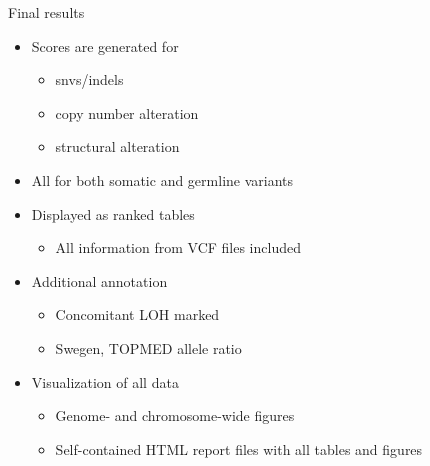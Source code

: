 \documentclass[usepdftitle=false]{beamer}
\begin{document}
\begin{frame}{Final results}
	\begin{itemize}
		\item Scores are generated for
		\begin{itemize}
			\item snvs/indels
			\item copy number alteration
			\item structural alteration
		\end{itemize}
		\pause
		\item All for both somatic and germline variants
		\item Displayed as ranked tables
		\begin{itemize}
			\item All information from VCF files included
		\end{itemize}
		\pause
		\item Additional annotation
		\begin{itemize}
			\item Concomitant LOH marked
			\item Swegen, TOPMED allele ratio
		\end{itemize}
		\pause
		\item Visualization of all data
		\begin{itemize}
			\item Genome- and chromosome-wide figures
			\item Self-contained HTML report files with all tables and figures
		\end{itemize}
	\end{itemize}
\end{frame}
\end{document}

